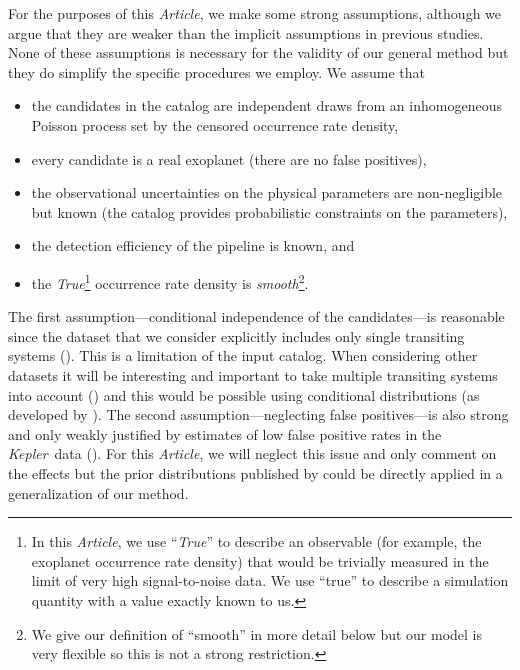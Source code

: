 \documentclass[12pt,preprint]{aastex}
\newcommand{\project}[1]{\emph{#1}}
\newcommand{\kepler}{\project{Kepler}}
\newcommand{\paper}{\textsl{Article}}
\newcommand{\foreign}[1]{\emph{#1}}
\newcommand{\True}{\foreign{True}}
\begin{document}
For the purposes of this \paper, we make some strong assumptions, although we
argue that they are weaker than the implicit assumptions in previous
studies.
None of these assumptions is necessary for the validity of our general method
but they do simplify the specific procedures we employ.
We assume that
\begin{itemize}

\item the candidates in the catalog are independent draws from an
inhomogeneous Poisson process set by the censored occurrence rate density,

\item every candidate is a real exoplanet (there are no false positives),

\item the observational uncertainties on the physical parameters are
non-negligible but known (the catalog provides probabilistic constraints on
the parameters),

\item the detection efficiency of the pipeline is known, and

\item the \True\footnote{In this \paper, we use ``\True'' to describe an
observable (for example, the exoplanet occurrence rate density) that would be
trivially measured in the limit of very high signal-to-noise data.
We use ``true'' to describe a simulation quantity with a value exactly known
to us.} occurrence rate density is \emph{smooth}\footnote{We give our
definition of ``smooth'' in more detail below but our model is very flexible
so this is not a strong restriction.}.

\end{itemize}
The first assumption---conditional independence of the candidates---is
reasonable since the dataset that we consider explicitly includes only single
transiting systems (\citealt{petigura}).
This is a limitation of the input catalog.
When considering other datasets it will be interesting and important to take
multiple transiting systems into account (\citealt{lissauer, tremaine, fang})
and this would be possible using conditional distributions (as developed by
\citealt{tremaine}).
The second assumption---neglecting false positives---is also strong and only
weakly justified by estimates of low false positive rates in the \kepler\ data
(\citealt{fressin-fp, morton}).
For this \paper, we will neglect this issue and only comment on the effects
but the prior distributions published by \citet{fressin-fp} could be directly
applied in a generalization of our method.
\end{document}
